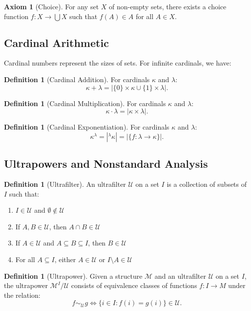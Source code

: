 \documentclass[12pt,a4paper]{article}
\theoremstyle{definition}
\newtheorem{definition}[theorem]{Definition}
\newtheorem{axiom}[theorem]{Axiom}
\theoremstyle{remark}
\begin{document}
\begin{axiom}[Choice]
For any set $X$ of non-empty sets, there exists a choice function $f : X \to \bigcup X$ such that $f(A) \in A$ for all $A \in X$.
\end{axiom}

\subsection{Cardinal Arithmetic}

Cardinal numbers represent the sizes of sets. For infinite cardinals, we have:

\begin{definition}[Cardinal Addition]
For cardinals $\kappa$ and $\lambda$:
\[
\kappa + \lambda = |\{0\} \times \kappa \cup \{1\} \times \lambda|.
\]
\end{definition}

\begin{definition}[Cardinal Multiplication]
For cardinals $\kappa$ and $\lambda$:
\[
\kappa \cdot \lambda = |\kappa \times \lambda|.
\]
\end{definition}

\begin{definition}[Cardinal Exponentiation]
For cardinals $\kappa$ and $\lambda$:
\[
\kappa^\lambda = |{}^\lambda\kappa| = |\{f : \lambda \to \kappa\}|.
\]
\end{definition}

\subsection{Ultrapowers and Nonstandard Analysis}

\begin{definition}[Ultrafilter]
An ultrafilter $\mathcal{U}$ on a set $I$ is a collection of subsets of $I$ such that:
\begin{enumerate}
\item $I \in \mathcal{U}$ and $\emptyset \notin \mathcal{U}$
\item If $A, B \in \mathcal{U}$, then $A \cap B \in \mathcal{U}$
\item If $A \in \mathcal{U}$ and $A \subseteq B \subseteq I$, then $B \in \mathcal{U}$
\item For all $A \subseteq I$, either $A \in \mathcal{U}$ or $I \setminus A \in \mathcal{U}$
\end{enumerate}
\end{definition}

\begin{definition}[Ultrapower]
Given a structure $\mathcal{M}$ and an ultrafilter $\mathcal{U}$ on a set $I$, the ultrapower $\mathcal{M}^I/\mathcal{U}$ consists of equivalence classes of functions $f : I \to M$ under the relation:
\[
f \sim_{\mathcal{U}} g \iff \{i \in I : f(i) = g(i)\} \in \mathcal{U}.
\]
\end{definition}
\end{document}
